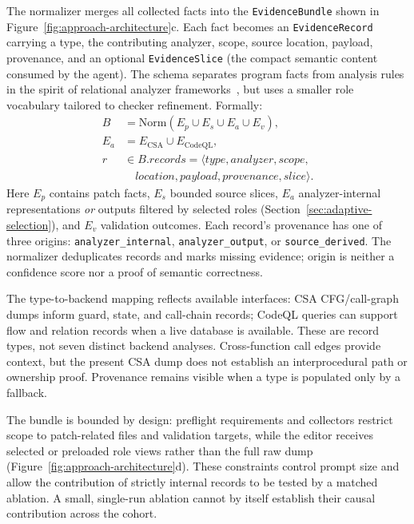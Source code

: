 The normalizer merges all collected facts into the \texttt{EvidenceBundle} shown in Figure~\ref{fig:approach-architecture}c.  Each fact becomes an \texttt{EvidenceRecord} carrying a type, the contributing analyzer, scope, source location, payload, provenance, and an optional \texttt{EvidenceSlice} (the compact semantic content consumed by the agent).  The schema separates program facts from analysis rules in the spirit of relational analyzer frameworks~\cite{avgustinov2016ql,jordan2016souffle,bravenboer2009doop}, but uses a smaller role vocabulary tailored to checker refinement.  Formally:
\begin{equation}
\begin{aligned}
B &= \mathrm{Norm}(E_p \cup E_s \cup E_a \cup E_v),\\
E_a &= E_{\mathrm{CSA}} \cup E_{\mathrm{CodeQL}},\\
r &\in B.records = \langle type, analyzer, scope,\\
&\quad location, payload, provenance, slice\rangle.
\end{aligned}
\label{eq:evidence-bundle}
\end{equation}
Here $E_p$ contains patch facts, $E_s$ bounded source slices, $E_a$ analyzer-internal representations \emph{or} outputs filtered by selected roles (Section~\ref{sec:adaptive-selection}), and $E_v$ validation outcomes. Each record's provenance has one of three origins: \texttt{analyzer\_\allowbreak internal}, \texttt{analyzer\_\allowbreak output}, or \texttt{source\_\allowbreak derived}. The normalizer deduplicates records and marks missing evidence; origin is neither a confidence score nor a proof of semantic correctness.

The type-to-backend mapping reflects available interfaces: CSA CFG/call-graph dumps inform guard, state, and call-chain records; CodeQL queries can support flow and relation records when a live database is available.  These are record types, not seven distinct backend analyses.  Cross-function call edges provide context, but the present CSA dump does not establish an interprocedural path or ownership proof.  Provenance remains visible when a type is populated only by a fallback.

The bundle is bounded by design: preflight requirements and collectors restrict scope to patch-related files and validation targets, while the editor receives selected or preloaded role views rather than the full raw dump (Figure~\ref{fig:approach-architecture}d).  These constraints control prompt size and allow the contribution of strictly internal records to be tested by a matched ablation.  A small, single-run ablation cannot by itself establish their causal contribution across the cohort.

